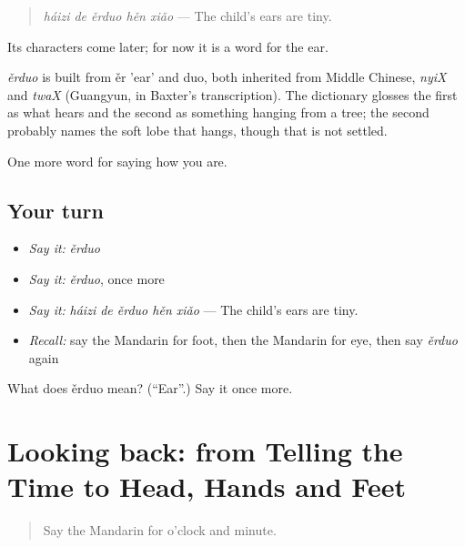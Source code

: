 \begin{quote}
\emph{háizi de ěrduo hěn xiǎo} — The child's ears are tiny.
\end{quote}

Its characters come later; for now it is a word for the ear.

\begin{cousinweb}
\emph{ěrduo} is built from ěr 'ear' and duo, both inherited from Middle Chinese, \emph{nyiX} and \emph{twaX} (Guangyun, in Baxter's transcription). The dictionary glosses the first as what hears and the second as something hanging from a tree; the second probably names the soft lobe that hangs, though that is not settled.
\end{cousinweb}

\begin{grammarlens}[title={What you've built}]
One more word for saying how you are.
\end{grammarlens}

\subsection*{Your turn}
\begin{itemize}
\raggedright
  \item \emph{Say it:} \emph{ěrduo}
  \item \emph{Say it:} \emph{ěrduo}, once more
  \item \emph{Say it:} \emph{háizi de ěrduo hěn xiǎo} — The child's ears are tiny.
  \item \emph{Recall:} say the Mandarin for foot, then the Mandarin for eye, then say \emph{ěrduo} again
\end{itemize}

\begin{tcolorbox}[breakable,colback=teal!4,colframe=teal!35!black,title={Before you move on}]
What does ěrduo mean? (\textquotedblleft{}Ear\textquotedblright{}.) Say it once more.
\end{tcolorbox}
\section[(dialogue)]{Looking back: from Telling the Time to Head, Hands and Feet}

\label{lesson:ZH-R52-review-48-52}



\begin{quote}
Say the Mandarin for o'clock and minute.
\end{quote}

